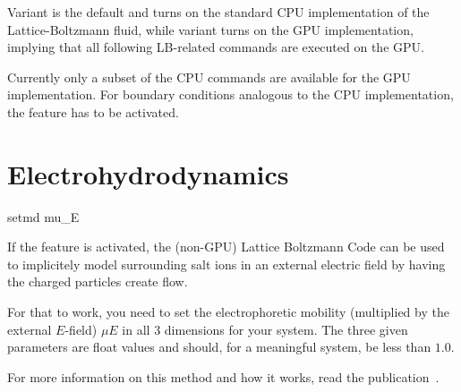 Variant  is the default and turns on the standard CPU
implementation of the Lattice-Boltzmann fluid, while variant
 turns on the GPU implementation, implying that all
following LB-related commands are executed on the GPU.

Currently only a subset of the CPU commands are available for the GPU
implementation.  For boundary conditions analogous to the CPU
implementation, the feature  has to be
activated.


\section{Electrohydrodynamics}

\begin{essyntax}
  setmd mu_E   
  \begin{features}
  \end{features}
\end{essyntax}

If the feature  is activated, the
(non-GPU) Lattice Boltzmann Code can be used to implicitely model
surrounding salt ions in an external electric field by having the
charged particles create flow.

For that to work, you need to set the electrophoretic mobility
(multiplied by the external $E$-field) $\mu E$ in all 3 dimensions for
your system. The three given parameters are float values and should,
for a meaningful system, be less than $1.0$.

For more information on this method and how it works, read the
publication~\cite{hickey10a}.

